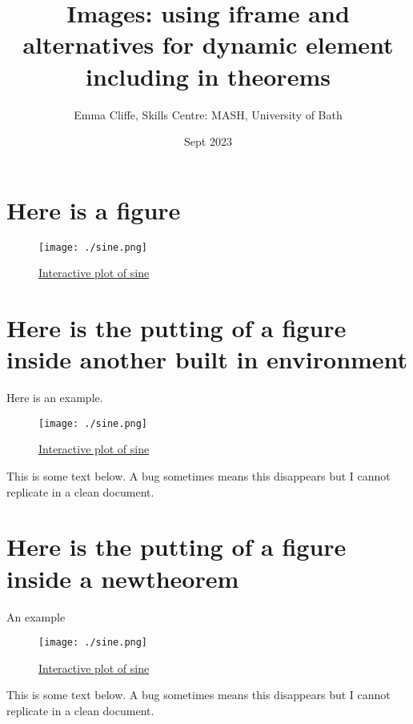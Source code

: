 \documentclass[
  12pt,
  a4paper]{extarticle}
\title{Images: using iframe and alternatives for dynamic element including in theorems}
\author{Emma Cliffe, Skills Centre: MASH, University of Bath}
\date{Sept 2023}
\theoremstyle{plain}
\theoremstyle{definition}
\theoremstyle{plain}
\theoremstyle{plain}
\theoremstyle{plain}
\theoremstyle{definition}
\theoremstyle{definition}
\theoremstyle{definition}
\theoremstyle{remark}
\theoremstyle{plain}
\let\BeginKnitrBlock\begin \let\EndKnitrBlock\end
\renewcommand{\;}{\,}
\begin{document}
\maketitle

{
\setcounter{tocdepth}{2}
\tableofcontents
}
\hypertarget{here-is-a-figure}{%
\section{Here is a figure}\label{here-is-a-figure}}

\begin{figure}
\centering
\texttt{[image: ./sine.png]}
\caption{\href{https://www.desmos.com/calculator/lbcljsazlt}{Interactive plot of sine}\label{sine}}
\end{figure}

\hypertarget{here-is-the-putting-of-a-figure-inside-another-built-in-environment}{%
\section{Here is the putting of a figure inside another built in environment}\label{here-is-the-putting-of-a-figure-inside-another-built-in-environment}}

\BeginKnitrBlock{example}
{\label{exm:unnamed-chunk-1} }Here is an example.

\begin{figure}
\centering
\texttt{[image: ./sine.png]}
\caption{\href{https://www.desmos.com/calculator/lbcljsazlt}{Interactive plot of sine}\label{sine}}
\end{figure}

This is some text below. A bug sometimes means this disappears but I cannot replicate in a clean document.
\EndKnitrBlock{example}

\hypertarget{here-is-the-putting-of-a-figure-inside-a-newtheorem}{%
\section{Here is the putting of a figure inside a newtheorem}\label{here-is-the-putting-of-a-figure-inside-a-newtheorem}}

\BeginKnitrBlock{Example*}
{}An example

\begin{figure}
\centering
\texttt{[image: ./sine.png]}
\caption{\href{https://www.desmos.com/calculator/lbcljsazlt}{Interactive plot of sine}\label{sine}}
\end{figure}

This is some text below. A bug sometimes means this disappears but I cannot replicate in a clean document.
\EndKnitrBlock{Example*}
\end{document}
